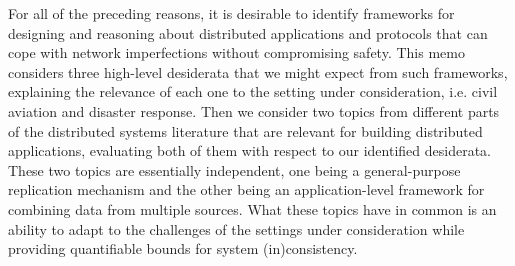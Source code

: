 For all of the preceding reasons, it is desirable to identify
frameworks for designing and reasoning about distributed applications
and protocols that can cope with network imperfections without
compromising safety. This memo considers three high-level desiderata
that we might expect from such frameworks, explaining the relevance of
each one to the setting under consideration, i.e. civil aviation and
disaster response. Then we consider two topics from different parts of
the distributed systems literature that are relevant for building
distributed applications, evaluating both of them with respect to our
identified desiderata. These two topics are essentially independent,
one being a general-purpose replication mechanism and the other being
an application-level framework for combining data from multiple
sources. What these topics have in common is an ability to adapt to
the challenges of the settings under consideration while providing
quantifiable bounds for system (in)consistency.
